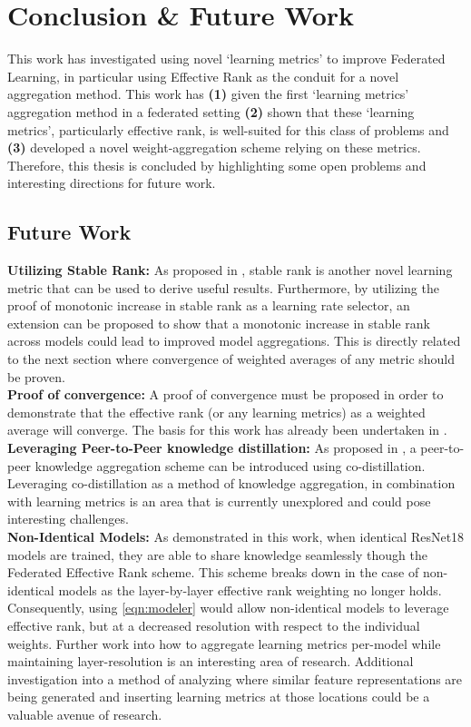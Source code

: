 \chapter{Conclusion \& Future Work}
This work has investigated using novel `learning metrics' to improve Federated Learning, in particular using Effective Rank as the conduit for a novel aggregation method. This work has \textbf{(1)} given the first `learning metrics' aggregation method in a federated setting \textbf{(2)} shown that these `learning metrics', particularly effective rank, is well-suited for this class of problems and \textbf{(3)} developed a novel weight-aggregation scheme relying on these metrics. Therefore, this thesis is concluded by highlighting some open problems and interesting directions for future work. 

\section{Future Work}\label{sec:future-work}
\textbf{Utilizing Stable Rank:} As proposed in \cite{hosseini2022explainable}, stable rank is another novel learning metric that can be used to derive useful results. Furthermore, by utilizing the proof of monotonic increase in stable rank as a learning rate selector, an extension can be proposed to show that a monotonic increase in stable rank across models could lead to improved model aggregations. This is directly related to the next section where convergence of weighted averages of any metric should be proven.\\

\textbf{Proof of convergence:} A proof of convergence must be proposed in order to demonstrate that the effective rank (or any learning metrics) as a weighted average will converge. The basis for this work has already been undertaken in \cite{karimireddy2020scaffold}. \\

\textbf{Leveraging Peer-to-Peer knowledge distillation:} As proposed in \cite{sodhani2020closer}, a peer-to-peer knowledge aggregation scheme can be introduced using co-distillation. Leveraging co-distillation as a method of knowledge aggregation, in combination with learning metrics is an area that is currently unexplored and could pose interesting challenges.\\

\textbf{Non-Identical Models:} As demonstrated in this work, when identical ResNet18 models are trained, they are able to share knowledge seamlessly though the Federated Effective Rank scheme. This scheme breaks down in the case of non-identical models as the layer-by-layer effective rank weighting no longer holds. Consequently, using \autoref{eqn:modeler} would allow non-identical models to leverage effective rank, but at a decreased resolution with respect to the individual weights. Further work into how to aggregate learning metrics per-model while maintaining layer-resolution is an interesting area of research. Additional investigation into a method of analyzing where similar feature representations are being generated and inserting learning metrics at those locations could be a valuable avenue of research.